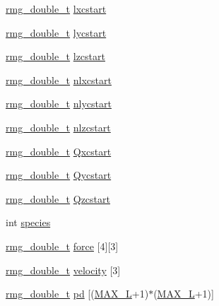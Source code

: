 \begin{DoxyCompactItemize}
\hyperlink{rmgtypes_8h_aaa16921c14f121c56eaa42390a340db8}{rmg\-\_\-double\-\_\-t} \hyperlink{struct_i_o_n_abcfaa7cc38bd26a2d63873e99eb4ad4c}{lxcstart}
\item 
\hyperlink{rmgtypes_8h_aaa16921c14f121c56eaa42390a340db8}{rmg\-\_\-double\-\_\-t} \hyperlink{struct_i_o_n_a2444c334604f8eb16df2e32a7ecc98c8}{lycstart}
\item 
\hyperlink{rmgtypes_8h_aaa16921c14f121c56eaa42390a340db8}{rmg\-\_\-double\-\_\-t} \hyperlink{struct_i_o_n_a95411b9b847287a90c8029af47c9226f}{lzcstart}
\item 
\hyperlink{rmgtypes_8h_aaa16921c14f121c56eaa42390a340db8}{rmg\-\_\-double\-\_\-t} \hyperlink{struct_i_o_n_a548b381a3e7eb1acbd8e1fe79f94e592}{nlxcstart}
\item 
\hyperlink{rmgtypes_8h_aaa16921c14f121c56eaa42390a340db8}{rmg\-\_\-double\-\_\-t} \hyperlink{struct_i_o_n_a0cf61bf0c46c92a807d0d2be920076f8}{nlycstart}
\item 
\hyperlink{rmgtypes_8h_aaa16921c14f121c56eaa42390a340db8}{rmg\-\_\-double\-\_\-t} \hyperlink{struct_i_o_n_a6e4013b98c035bd95fb343ddca742d84}{nlzcstart}
\item 
\hyperlink{rmgtypes_8h_aaa16921c14f121c56eaa42390a340db8}{rmg\-\_\-double\-\_\-t} \hyperlink{struct_i_o_n_a7db34dc67d3de05fcaf2d716819e6ed5}{Qxcstart}
\item 
\hyperlink{rmgtypes_8h_aaa16921c14f121c56eaa42390a340db8}{rmg\-\_\-double\-\_\-t} \hyperlink{struct_i_o_n_a87cc75d0bad5beaa4efb321d0f54246e}{Qycstart}
\item 
\hyperlink{rmgtypes_8h_aaa16921c14f121c56eaa42390a340db8}{rmg\-\_\-double\-\_\-t} \hyperlink{struct_i_o_n_ae882bdd3099ab8a58d3e903ba819ca95}{Qzcstart}
\item 
int \hyperlink{struct_i_o_n_abf4a17e1f32302b0aac312d865d8be20}{species}
\item 
\hyperlink{rmgtypes_8h_aaa16921c14f121c56eaa42390a340db8}{rmg\-\_\-double\-\_\-t} \hyperlink{struct_i_o_n_a19e23a7579d67ffd234a42c1a5c3ea30}{force} \mbox{[}4\mbox{]}\mbox{[}3\mbox{]}
\item 
\hyperlink{rmgtypes_8h_aaa16921c14f121c56eaa42390a340db8}{rmg\-\_\-double\-\_\-t} \hyperlink{struct_i_o_n_a9f49f7b68da1b80f4fdafece3f274c2b}{velocity} \mbox{[}3\mbox{]}
\item 
\hyperlink{rmgtypes_8h_aaa16921c14f121c56eaa42390a340db8}{rmg\-\_\-double\-\_\-t} \hyperlink{struct_i_o_n_a1c96a05624871df5174a4965ce074240}{pd} \mbox{[}(\hyperlink{_t_d_d_f_t_2_headers_2params_8h_adf2a0717e3307419a9d7c52707f5631e}{M\-A\-X\-\_\-\-L}+1)$\ast$(\hyperlink{_t_d_d_f_t_2_headers_2params_8h_adf2a0717e3307419a9d7c52707f5631e}{M\-A\-X\-\_\-\-L}+1)\mbox{]}

\end{DoxyCompactItemize}
